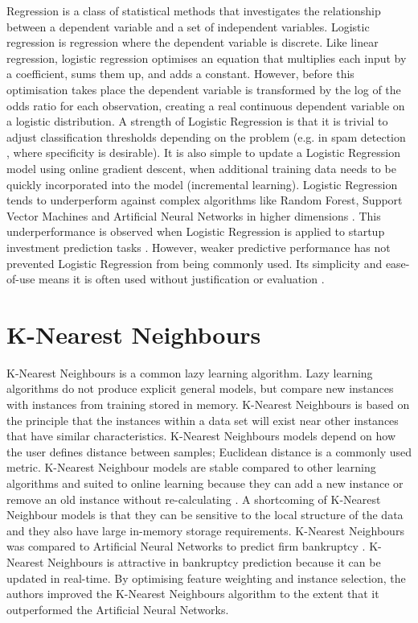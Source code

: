 Regression is a class of statistical methods that investigates the relationship between a dependent variable and a set of independent variables. Logistic regression is regression where the dependent variable is discrete. Like linear regression, logistic regression optimises an equation that multiplies each input by a coefficient, sums them up, and adds a constant. However, before this optimisation takes place the dependent variable is transformed by the log of the odds ratio for each observation, creating a real continuous dependent variable on a logistic distribution. A strength of Logistic Regression is that it is trivial to adjust classification thresholds depending on the problem (e.g. in spam detection \cite{friedman2001}, where specificity is desirable). It is also simple to update a Logistic Regression model using online gradient descent, when additional training data needs to be quickly incorporated into the model (incremental learning). Logistic Regression tends to underperform against complex algorithms like Random Forest, Support Vector Machines and Artificial Neural Networks in higher dimensions \cite{caruana2008}. This underperformance is observed when Logistic Regression is applied to startup investment prediction tasks \cite{beckwith2016, bhat2011}. However, weaker predictive performance has not prevented Logistic Regression from being commonly used. Its simplicity and ease-of-use means it is often used without justification or evaluation \cite{gimmon2010}.

\section{K-Nearest Neighbours}

K-Nearest Neighbours is a common lazy learning algorithm. Lazy learning algorithms do not produce explicit general models, but compare new instances with instances from training stored in memory. K-Nearest Neighbours is based on the principle that the instances within a data set will exist near other instances that have similar characteristics. K-Nearest Neighbours models depend on how the user defines distance between samples; Euclidean distance is a commonly used metric. K-Nearest Neighbour models are stable compared to other learning algorithms and suited to online learning because they can add a new instance or remove an old instance without re-calculating \cite{kotsiantis2007}. A shortcoming of K-Nearest Neighbour models is that they can be sensitive to the local structure of the data and they also have large in-memory storage requirements. K-Nearest Neighbours was compared to Artificial Neural Networks to predict firm bankruptcy \cite{ahn2008}. K-Nearest Neighbours is attractive in bankruptcy prediction because it can be updated in real-time. By optimising feature weighting and instance selection, the authors improved the K-Nearest Neighbours algorithm to the extent that it outperformed the Artificial Neural Networks.

